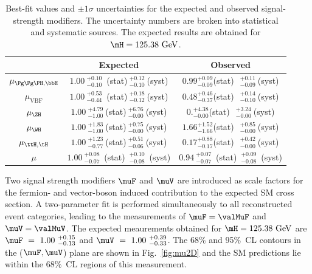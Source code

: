 \begin{table}[hb]
	\begin{center}
		\caption{
		Best-fit values and $\pm 1\sigma$ uncertainties for the expected and observed signal-strength modifiers.
		The uncertainty numbers are broken into statistical and systematic sources.
		The expected results are obtained for $\mH=125.38~\mathrm{GeV}$. %
		\label{tab:sigstr}
			}
    \renewcommand{\arraystretch}{1.5}
    \begin{tabular}{ccc}
	\hline
	& Expected & Observed \\
	\hline
	$\mu_{\Pg\Pg\PH,\bbH}$ & $1.00~^{+0.10}_{-0.10}$~(stat)$~^ {+0.12}_{-0.10}~$(syst) & $0.99 ^{+0.09 }_{-0.09}$(stat)~$~^ {+0.11}_{-0.09}~$(syst) \\
  $\mu_{\mathrm{VBF}}$ & $1.00~^{+0.53}_{-0.44}$~(stat)$~^ {+0.18}_{-0.12}~$(syst) & $0.48 ^{+0.46}_{-0.37}$(stat)~$~^ {+0.14}_{-0.10}~$(syst) \\
  $\mu_{\ZH}$ & $1.00~^{+4.79}_{-1.00}~$(stat)$~^ {+6.76}_{-0.00}~$(syst) & $0. ^{+4.38}_{-0.00}$(stat)~$~^ {+3.24}_{-0.00}~$(syst) \\
  $\mu_{\WH}$ & $1.00~^{+1.83}_{-1.00}~$(stat)$~^{+0.75}_{-0.00}~$(syst) & $1.66 ^{+1.52}_{-1.66}$(stat)~$~^ {+0.85}_{-0.00}~$(syst) \\
	$\mu_{\ttH,\tH}$ & $1.00~^{+1.23}_{-0.77}~$(stat)$~^ {+0.51}_{-0.06}~$(syst) & $0.17 ^{+0.88}_{-0.17}$(stat)~$~^{+0.42}_{-0.00}~$(syst) \\
		  	\hline
	$\mu$ & $1.00~^{+0.08}_{-0.07}$~(stat)~$^{+0.10}_{-0.08}$~(syst) & $0.94~^{+0.07}_{-0.07}$~(stat)~$^{+0.09}_{-0.08}$~(syst)\\
	\hline
\end{tabular}
	\end{center}
\end{table}

Two signal strength modifiers $\muF$ and $\muV$ are introduced as scale factors for the fermion- and vector-boson induced contribution to the expected SM cross section.
A two-parameter fit is performed simultaneously to all reconstructed event categories, leading to the measurements of $\muF=\valMuF$ and $\muV=\valMuV$. 
The expected meaurements obtained for $\mH=125.38~\mathrm{GeV}$ are $\muF~=~1.00~^{+0.15}_{-0.13}$ and $\muV~=~1.00~^{+0.39}_{-0.33}$.
The 68\% and 95\%~CL contours in the ($\muF,\muV$) plane are shown in Fig.~\ref{fig:mu2D} and the SM predictions lie within the 68\%~CL regions of this measurement.

